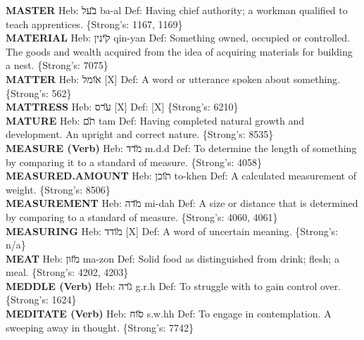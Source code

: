 {\textbf{MASTER} Heb: {\large\H בעל} ba-al Def: Having chief authority; a workman qualified to teach apprentices. \{Strong's: 1167, 1169\}\hfill{}\\

\textbf{MATERIAL} Heb: {\large\H קינין} qin-yan Def: Something owned, occupied or controlled. The goods and wealth acquired from the idea of acquiring materials for building a nest. \{Strong's: 7075\}\hfill{}\\

\textbf{MATTER} Heb: {\large\H אומל} {[}X{]} Def: A word or utterance spoken about something. \{Strong's: 562\}\hfill{}\\

\textbf{MATTRESS} Heb: {\large\H ערס} {[}X{]} Def: {[}X{]} \{Strong's: 6210\}\hfill{}\\

\textbf{MATURE} Heb: {\large\H תם} tam Def: Having completed natural growth and development. An upright and correct nature. \{Strong's: 8535\}\hfill{}\\

\textbf{MEASURE (Verb)} Heb: {\large\H מדד} m.d.d Def: To determine the length of something by comparing it to a standard of measure. \{Strong's: 4058\}\hfill{}\\

\textbf{MEASURED.AMOUNT} Heb: {\large\H תוכן} to-khen Def: A calculated measurement of weight. \{Strong's: 8506\}\hfill{}\\

\textbf{MEASUREMENT} Heb: {\large\H מדה} mi-dah Def: A size or distance that is determined by comparing to a standard of measure. \{Strong's: 4060, 4061\}\hfill{}\\

\textbf{MEASURING} Heb: {\large\H מודד} {[}X{]} Def: A word of uncertain meaning. \{Strong's: n/a\}\hfill{}\\

\textbf{MEAT} Heb: {\large\H מזון} ma-zon Def: Solid food as distinguished from drink; flesh; a meal. \{Strong's: 4202, 4203\}\hfill{}\\

\textbf{MEDDLE (Verb)} Heb: {\large\H גרה} g.r.h Def: To struggle with to gain control over. \{Strong's: 1624\}\hfill{}\\

\textbf{MEDITATE (Verb)} Heb: {\large\H סוח} s.w.hh Def: To engage in contemplation. A sweeping away in thought. \{Strong's: 7742\}\hfill{}\\

}
